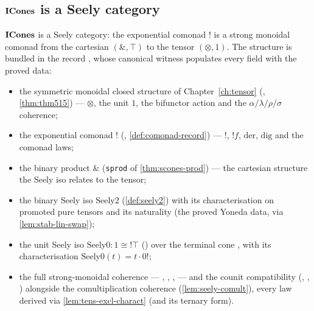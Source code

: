 \subsection{\texorpdfstring{$\mathbf{ICones}$}{ICones} is a Seely category}\label{sec:seely-thm}

\begin{theorem}\label{thm:seely}
\rocqok
{}
$\mathbf{ICones}$ is a Seely category: the exponential comonad $\mathord{!}$ is
a strong monoidal comonad from the cartesian $(\mathbin{\&}, \top)$ to
the tensor $(\otimes, 1)$. The structure is bundled in the record
, whose canonical witness
 populates every field with the
proved data:
\begin{itemize}
  \item the symmetric monoidal closed structure of
    Chapter~\ref{ch:tensor} (,
    \autoref{thm:thm515}) --- $\otimes$, the unit $1$, the bifunctor
    action and the $\alpha/\lambda/\rho/\sigma$ coherence;
  \item the exponential comonad $\mathord{!}$
    (, \autoref{def:comonad-record}) ---
    $\mathord{!}$, $\mathord{!}f$, $\mathrm{der}$, $\mathrm{dig}$ and the
    comonad laws;
  \item the binary product $\mathbin{\&}$ (\texttt{sprod} of
    \autoref{thm:scones-prod}) --- the cartesian structure the Seely
    iso relates to the tensor;
  \item the binary Seely iso $\mathrm{Seely2}$ (\autoref{def:seely2})
    with its characterisation on promoted pure tensors and its
    naturality (the proved Yoneda data, via \autoref{lem:stab-lin-swap});
  \item the unit Seely iso $\mathrm{Seely0} : 1 \cong \mathord{!}\top$
    () over the terminal cone
    , with its characterisation
    $\mathrm{Seely0}(t) = t \cdot 0!$;
  \item the full strong-monoidal coherence ---
    ,
    ,
    ,
     --- and the counit
    compatibility (,
    ,
    ) alongside the comultiplication
    coherence (\autoref{lem:seely-comult}), every law derived via
    \autoref{lem:tens-excl-charact} (and its ternary form).
\end{itemize}
\end{theorem}

